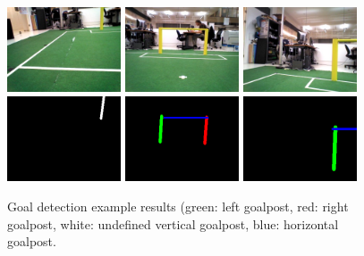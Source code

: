 \documentclass[	DIV=calc,%
							paper=a4,%
							fontsize=9pt,%
							twocolumn]{scrartcl}	 					%
\begin{document}
\begin{figure}[t!]
\caption{Goal detection example results (green: left goalpost, red: right goalpost, white: undefined vertical goalpost, blue: horizontal goalpost.}
\label{posts}
\centering    
\includegraphics[width=0.3\textwidth]{figures/img_000003.jpg}	
\includegraphics[width=0.3\textwidth]{figures/img_000005.jpg}	
\includegraphics[width=0.3\textwidth]{figures/img_000006.jpg} \\
\includegraphics[width=0.3\textwidth]{figures/post3.png}
\includegraphics[width=0.3\textwidth]{figures/post5.png}
\includegraphics[width=0.3\textwidth]{figures/post6.png}
\end{figure}
\end{document}
